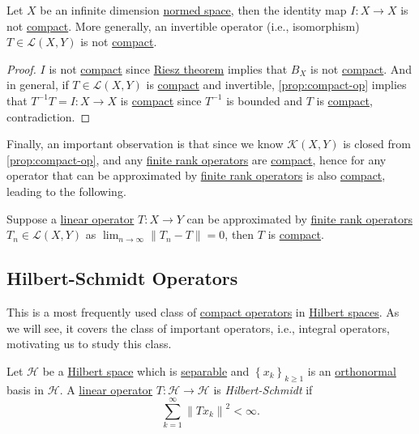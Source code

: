 \begin{corollary}\label{col:iso-are-not-compact}
	Let \(X\) be an infinite dimension \hyperref[def:normed-vector-space]{normed space}, then the identity map \(I\colon X\to X\) is not \hyperref[def:compact-op]{compact}. More generally, an invertible operator (i.e., isomorphism) \(T\in \mathcal{L} (X, Y)\) is not \hyperref[def:compact-op]{compact}.
\end{corollary}
\begin{proof}
	\(I\) is not \hyperref[def:compact-op]{compact} since \hyperref[thm:Riesz]{Riesz theorem} implies that \(B_X\) is not \hyperref[def:compact]{compact}. And in general, if \(T\in \mathcal{L} (X, Y)\) is \hyperref[def:compact-op]{compact} and invertible, \autoref{prop:compact-op} implies that \(T^{-1} T = I\colon X\to X\) is \hyperref[def:compact-op]{compact} since \(T^{-1} \) is bounded and \(T\) is \hyperref[def:compact-op]{compact}, contradiction.
\end{proof}

Finally, an important observation is that since we know \(\mathcal{K}(X, Y)\) is closed from \autoref{prop:compact-op}, and any \hyperref[rmk:finite-rank-op]{finite rank operators} are \hyperref[def:compact-op]{compact}, hence for any operator that can be approximated by \hyperref[rmk:finite-rank-op]{finite rank operators} is also \hyperref[def:compact-op]{compact}, leading to the following.

\begin{corollary}\label{col:almost-finite-rank-op-are-compact}
	Suppose a \hyperref[def:linear-map]{linear operator} \(T\colon X\to Y\) can be approximated by \hyperref[rmk:finite-rank-op]{finite rank operators} \(T_{n} \in \mathcal{L} (X, Y)\) as \(\lim_{n \to \infty} \lVert T_{n} - T \rVert = 0\), then \(T\) is \hyperref[def:compact-op]{compact}.
\end{corollary}

\subsection{Hilbert-Schmidt Operators}
This is a most frequently used class of \hyperref[def:compact-op]{compact operators} in \hyperref[def:Hilbert-space]{Hilbert spaces}. As we will see, it covers the class of important operators, i.e., integral operators, motivating us to study this class.

\begin{definition}\label{def:Hilbert-Schmidt-op}
	Let \(\mathcal{H} \) be a \hyperref[def:Hilbert-space]{Hilbert space} which is \hyperref[def:separable]{separable} and \(\left\{ x_k \right\} _{k\geq 1}\) is an \hyperref[def:orthonormal-system]{orthonormal} basis in \(\mathcal{H} \). A \hyperref[def:linear-map]{linear operator} \(T\colon \mathcal{H} \to \mathcal{H} \) is \emph{Hilbert-Schmidt} if
	\[
		\sum_{k=1}^{\infty} \left\lVert T x_{k} \right\rVert ^{2} < \infty.
	\]
\end{definition}

